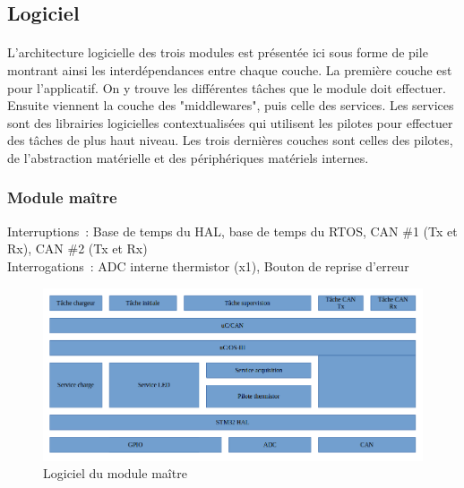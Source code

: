 \subsection{Logiciel}
	\paragraph*{}
	L'architecture logicielle des trois modules est présentée ici sous forme de pile montrant ainsi les interdépendances entre chaque couche. La première couche est pour l'applicatif. On y trouve les différentes tâches que le module doit effectuer. Ensuite viennent la couche des "middlewares", puis celle des services. Les services sont des librairies logicielles contextualisées qui utilisent les pilotes pour effectuer des tâches de plus haut niveau. Les trois dernières couches sont celles des pilotes, de l'abstraction matérielle et des périphériques matériels internes.
	\subsubsection{Module maître}
		\noindent
		Interruptions : Base de temps du HAL, base de temps du RTOS, CAN \#1 (Tx et Rx),  CAN \#2 (Tx et Rx) \\
		Interrogations : ADC interne thermistor (x1), Bouton de reprise d’erreur
		\begin{figure}[H]
			\centering
			\includegraphics[scale=0.5]{Images/Logiciel_Master.png}
			\caption{Logiciel du module maître}
			\label{fig:logiciel_master}
		\end{figure}
